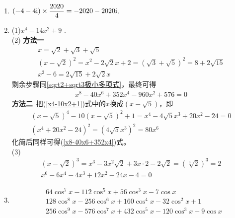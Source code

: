 \begin{enumerate}[label={\textbf{\arabic*.}},leftmargin=
    \inteval{\myenumleftmargin}pt]
\item $ (-4-4\mathrm{i})\times \dfrac{2020}{4}=-2020-2020\mathrm{i} $. 

\item (1)$ x^4-14x^2+9 $ .\\
(2) \textbf{方法一}\ 
\begin{gather*}
    x= \sqrt{2}+\sqrt{3}+\sqrt{5} \\
    (x-\sqrt{2})^2=x^2-2\sqrt{2}x+2= (\sqrt{3}+\sqrt{5})^2= 8+2\sqrt{15} \\
    x^2-6=2\sqrt{15}+2\sqrt{2}x
\end{gather*}
剩余步骤同\ref{sqrt2+sqrt3极小多项式}，最终可得
\begin{align}\label{x8-40x6+352x4}
    x^8-40x^6+352x^4-960x^2+576=0
\end{align}
\textbf{方法二}\ 把(\ref{x4-10x2+1})式中的$ x $换成$ (x-\sqrt{5}) $，即
\begin{gather*}
    (x-\sqrt{5})^4-10(x-\sqrt{5})^2+1=x^4-4\sqrt{5}x^3+20x^2-24=0\\
    (x^4+20x^2-24)^2=(4\sqrt{5}x^3)^2=80x^6
\end{gather*}
化简后同样可得(\ref{x8-40x6+352x4})式。 \\
(3)
\begin{gather*}
    (x-\sqrt{2})^3=x^3-3x^2\sqrt{2}+3x\cdot 2-2\sqrt{2}=(\sqrt[3]{2})^3=2 \\
    x^6-6x^4-4x^3+12x^2-24x-4=0
\end{gather*}

\item
\begin{align*}
    & 64\cos^7x-112\cos^5x+56\cos^3x-7\cos x \\
    & 128\cos^8x-256\cos^6x+160\cos^4x-32\cos^2x+1 \\
    & 256\cos^9x-576\cos^7x+432\cos^5x-120\cos^3x+9\cos x
\end{align*}

\end{enumerate}

\myfootnote{\CopyrightStatementChap}
\cleardoublepage


